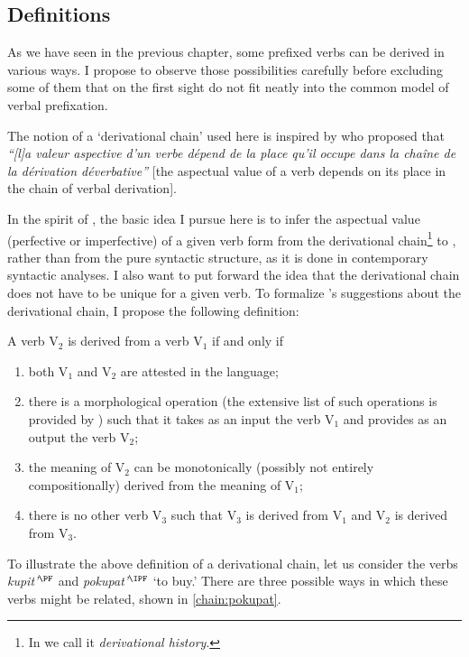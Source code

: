 \subsection{Definitions}\label{section:chains:definition}
As we have seen in the previous chapter, some prefixed verbs can be derived in various ways. I propose to observe those possibilities carefully before excluding some of them that on the first sight do not fit neatly into the common model of verbal prefixation.

The notion of a `derivational chain' used here is inspired by \citet{Karcevski:27} who proposed that \textit{``[l]a valeur aspective d'un verbe d\'{e}pend de la place qu'il occupe dans la cha\^{i}ne de la d\'{e}rivation d\'{e}verbative''} [the aspectual value of a verb depends on its place in the chain of verbal derivation].

In the spirit of \citet{Karcevski:27}, the basic idea I pursue here is to infer the aspectual value (perfective or imperfective) of a given verb form from the derivational chain\footnote{In \citet{ZinovaFilip:14b} we call it \textit{derivational history}.} to , rather than from the pure syntactic structure, as it is done in contemporary syntactic analyses. I also want to put forward the idea that the derivational chain does not have to be unique for a given verb. To formalize \citeauthor{Karcevski:27}'s \citeyear{Karcevski:27} suggestions about the derivational chain, I propose the following definition:
\begin{definition}\label{def:history}
A verb V$_2$ is derived from a verb V$_1$ if and only if
\begin{enumerate}
\item both V$_1$ and V$_2$ are attested in the language;
\item there is a morphological operation (the extensive list of such operations is provided by \citealt{Shvedova:82}) such that it takes as an input the verb V$_1$ and provides as an output the verb V$_2$;
\item the meaning of V$_2$ can be monotonically (possibly not entirely compositionally) derived from the meaning of V$_1$;
\item there is no other verb V$_3$ such that V$_3$ is derived from V$_1$ and V$_2$ is derived from V$_3$.
\end{enumerate}
\end{definition}

To illustrate the above definition of a derivational chain, let us consider the verbs \textit{kupit'$^\PF$} and \textit{pokupat'$^\IPF$} `to buy.' There are three possible ways in which these verbs might be related, shown in \ref{chain:pokupat}.

